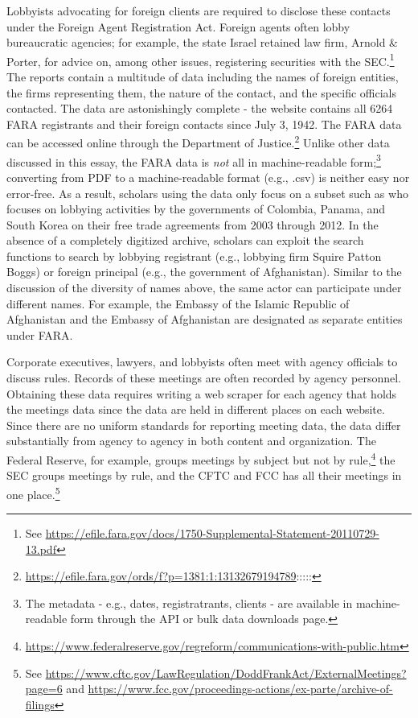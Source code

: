 \documentclass[
      12pt,
        ]{article}
\begin{document}
Lobbyists advocating for foreign clients are required to disclose these
contacts under the Foreign Agent Registration Act. Foreign agents often
lobby bureaucratic agencies; for example, the state Israel retained law
firm, Arnold \& Porter, for advice on, among other issues, registering
securities with the SEC.\footnote{See
  \url{https://efile.fara.gov/docs/1750-Supplemental-Statement-20110729-13.pdf}}
The reports contain a multitude of data including the names of foreign
entities, the firms representing them, the nature of the contact, and
the specific officials contacted. The data are astonishingly complete -
the website contains all 6264 FARA registrants and their foreign
contacts since July 3, 1942. The FARA data can be accessed online
through the Department of Justice.\footnote{\url{https://efile.fara.gov/ords/f?p=1381:1:13132679194789}:::::}
Unlike other data discussed in this essay, the FARA data is \emph{not}
all in machine-readable form;\footnote{The metadata - e.g., dates,
  registratrants, clients - are available in machine-readable form
  through the API or bulk data downloads page.} converting from PDF to a
machine-readable format (e.g., .csv) is neither easy nor error-free. As
a result, scholars using the data only focus on a subset such as
\citet{You2019} who focuses on lobbying activities by the governments of
Colombia, Panama, and South Korea on their free trade agreements from
2003 through 2012. In the absence of a completely digitized archive,
scholars can exploit the search functions to search by lobbying
registrant (e.g., lobbying firm Squire Patton Boggs) or foreign
principal (e.g., the government of Afghanistan). Similar to the
discussion of the diversity of names above, the same actor can
participate under different names. For example, the Embassy of the
Islamic Republic of Afghanistan and the Embassy of Afghanistan are
designated as separate entities under FARA.

Corporate executives, lawyers, and lobbyists often meet with agency
officials to discuss rules. Records of these meetings are often recorded
by agency personnel. Obtaining these data requires writing a web scraper
for each agency that holds the meetings data since the data are held in
different places on each website. Since there are no uniform standards
for reporting meeting data, the data differ substantially from agency to
agency in both content and organization. The Federal Reserve, for
example, groups meetings by subject but not by rule,\footnote{\url{https://www.federalreserve.gov/regreform/communications-with-public.htm}}
the SEC groups meetings by rule, and the CFTC and FCC has all their
meetings in one place.\footnote{See
  \url{https://www.cftc.gov/LawRegulation/DoddFrankAct/ExternalMeetings?page=6}
  and
  \url{https://www.fcc.gov/proceedings-actions/ex-parte/archive-of-filings}}
\end{document}
